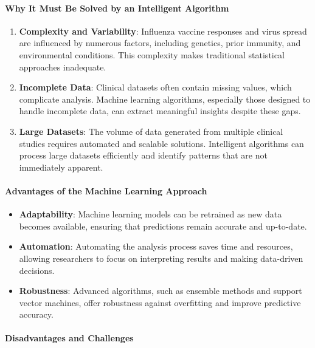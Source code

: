 \documentclass[runningheads,a4paper,11pt]{report}
\begin{document}
\paragraph{Why It Must Be Solved by an Intelligent Algorithm}

\begin{enumerate}
    \item \textbf{Complexity and Variability}: Influenza vaccine responses and virus spread are influenced by numerous factors, including genetics, prior immunity, and environmental conditions. This complexity makes traditional statistical approaches inadequate.
    \item \textbf{Incomplete Data}: Clinical datasets often contain missing values, which complicate analysis. Machine learning algorithms, especially those designed to handle incomplete data, can extract meaningful insights despite these gaps.
    \item \textbf{Large Datasets}: The volume of data generated from multiple clinical studies requires automated and scalable solutions. Intelligent algorithms can process large datasets efficiently and identify patterns that are not immediately apparent.
\end{enumerate}

\paragraph{Advantages of the Machine Learning Approach}

\begin{itemize}
    \item \textbf{Adaptability}: Machine learning models can be retrained as new data becomes available, ensuring that predictions remain accurate and up-to-date.
    \item \textbf{Automation}: Automating the analysis process saves time and resources, allowing researchers to focus on interpreting results and making data-driven decisions.
    \item \textbf{Robustness}: Advanced algorithms, such as ensemble methods and support vector machines, offer robustness against overfitting and improve predictive accuracy.
\end{itemize}

\paragraph{Disadvantages and Challenges}
\end{document}
